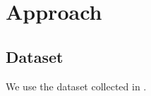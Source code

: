 \section{Approach}

\subsection{Dataset}
We use the \newsspike dataset collected in \citet{zhang2013parallelparaphrase}.
